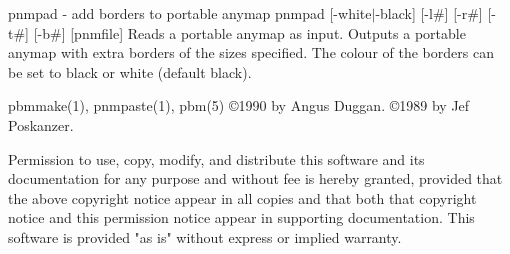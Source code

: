 %

\newpage
%

pnmpad - add borders to portable anymap
pnmpad [-white$|$-black] [-l\#] [-r\#] [-t\#] [-b\#] [pnmfile]
Reads a portable anymap as input. Outputs a portable anymap with extra
borders of the sizes specified. The colour of the borders can be set to
black or white (default black).

pbmmake(1), pnmpaste(1), pbm(5)
\copyright 1990 by Angus Duggan.
\copyright 1989 by Jef Poskanzer.

Permission to use, copy, modify, and distribute this software and its
documentation for any purpose and without fee is hereby granted, provided
that the above copyright notice appear in all copies and that both that
copyright notice and this permission notice appear in supporting
documentation.  This software is provided "as is" without express or
implied warranty.
%
 
%

\newpage
%

